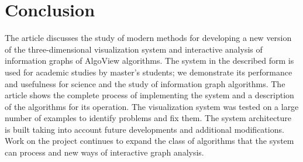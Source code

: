 \section{Conclusion}

The article discusses the study of modern methods for developing a new version of the three-dimensional visualization system and interactive analysis of information graphs of AlgoView algorithms. The system in the described form is used for academic studies by master's students; we demonstrate its performance and usefulness for science and the study of information graph algorithms. The article shows the complete process of implementing the system and a description of the algorithms for its operation. The visualization system was tested on a large number of examples to identify problems and fix them. The system architecture is built taking into account future developments and additional modifications. Work on the project continues to expand the class of algorithms that the system can process and new ways of interactive graph analysis.